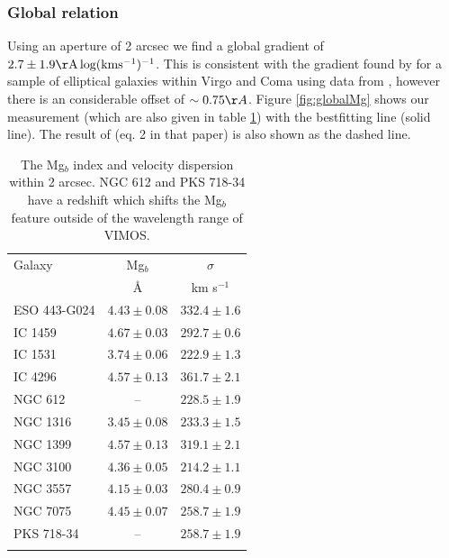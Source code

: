 {{{{{{		\subsubsection{Global relation}
			Using an aperture of 2 arcsec we find a global gradient of $2.7\pm1.9 \mathrm{\AA \, log(km s^{-1})^{-1}}$. This is consistent with the gradient found by \citet{Ziegler1997} for a sample of elliptical galaxies within Virgo and Coma using data from \citet{Dressler1987}, however there is an considerable offset of $\sim0.75\AA$. Figure \ref{fig:globalMg} shows our measurement (which are also given in table \ref{tab:globalMg}) with the bestfitting line (solid line). The result of \citet{Ziegler1997} (eq. 2 in that paper) is also shown as the dashed line. 

			\begin{table}
				\centering
				\caption{The Mg$_b$ index and velocity dispersion within 2 arcsec. NGC 612 and PKS 718-34 have a redshift which shifts the Mg$_b$ feature outside of the wavelength range of VIMOS.}
				\label{tab:globalMg}
				\begin{tabular}{l c c}
					\hline
					\hline
					Galaxy 	& Mg$_b$ & $\sigma$ \\
							& \AA 	& km s$^{-1}$ \\
					\hline
					ESO 443-G024 & $4.43 \pm 0.08$ & $332.4 \pm 1.6$ \\
					IC 1459 	& $4.67 \pm 0.03$ & $292.7 \pm 0.6$ \\
					IC 1531 	& $3.74 \pm 0.06$ & $222.9 \pm 1.3$ \\
					IC 4296		& $4.57 \pm 0.13$ & $361.7 \pm 2.1$ \\
					NGC 612 	& --   			  & $228.5 \pm 1.9$ \\
					NGC 1316 	& $3.45 \pm 0.08$ & $233.3 \pm 1.5$ \\
					NGC 1399 	& $4.57 \pm 0.13$ & $319.1 \pm 2.1$ \\
					NGC 3100 	& $4.36 \pm 0.05$ & $214.2 \pm 1.1$ \\
					NGC 3557 	& $4.15 \pm 0.03$ & $280.4 \pm 0.9$ \\
					NGC 7075 	& $4.45 \pm 0.07$ & $258.7 \pm 1.9$ \\
					PKS 718-34  & -- 		      & $258.7 \pm 1.9$ \\
					\hline \\
				\end{tabular}
			\end{table}

}}}}}}
